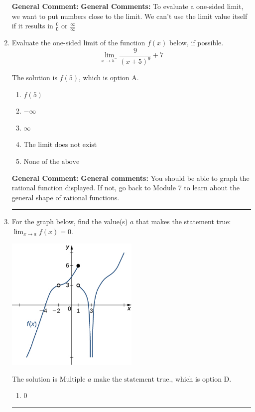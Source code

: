 \documentclass{extbook}[14pt]
\newcommand{\litem}[1]{\item #1

\rule{\textwidth}{0.4pt}}
\begin{document}
\begin{enumerate}
{\textbf{General Comment:} \textbf{General Comments:} To evaluate a one-sided limit, we want to put numbers close to the limit. We can't use the limit value itself if it results in $\frac{0}{0}$ or $\frac{\infty}{\infty}$
}
\litem{
Evaluate the one-sided limit of the function $f(x)$ below, if possible.
\[ \lim_{x \rightarrow 5^-} \frac{9}{(x+5)^9}+7 \]

The solution is \( f(5) \), which is option A.\begin{enumerate}[label=\Alph*.]
\item \( f(5) \)


\item \( -\infty \)


\item \( \infty \)


\item \( \text{The limit does not exist} \)


\item \( \text{None of the above} \)


\end{enumerate}

\textbf{General Comment:} \textbf{General comments:} You should be able to graph the rational function displayed. If not, go back to Module 7 to learn about the general shape of rational functions.
}
\litem{
For the graph below, find the value(s) $a$ that makes the statement true: $ \displaystyle \lim_{x \rightarrow a} f(x) = 0$.

\begin{center}
    \includegraphics[width=0.5\textwidth]{../Figures/evaluateLimitGraphicallyCopyA.png}
\end{center}




The solution is \( \text{Multiple } a \text{ make the statement true}. \), which is option D.\begin{enumerate}[label=\Alph*.]
\item \( 0 \)



\end{enumerate}}
\end{enumerate}
\end{document}
